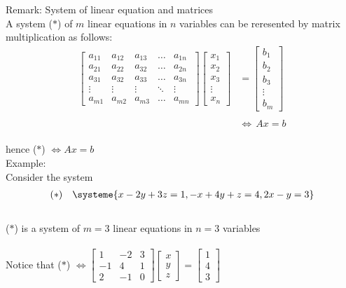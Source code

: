 \documentclass{jhwhw}
\begin{document}
Remark: System of linear equation and matrices\\
A system (\(\ast\)) of \(m\) linear equations in \(n\) variables can be reresented by matrix multiplication as follows:\\

\begin{align*} \begin{bmatrix} a_{11} & a_{12} & a_{13} & \ldots & a_{1n} \\ a_{21} & a_{22} & a_{32} & \ldots & a_{2n} \\ a_{31} & a_{32} & a_{33} & \ldots & a_{3n} \\ \vdots & \vdots & \vdots & \ddots & \vdots \\ a_{m1} & a_{m2} & a_{m3} & \ldots & a_{mn} \end{bmatrix} \begin{bmatrix} x_1 \\ x_2 \\ x_3 \\ \vdots \\ x_n \end{bmatrix} &= \begin{bmatrix} b_1 \\ b_2 \\ b_3 \\ \vdots \\ b_m \end{bmatrix} \\ \\ 
&\Leftrightarrow \, Ax = b
\end{align*}
\\
hence (\(\ast\)) \(\Leftrightarrow Ax = b\)\\

Example:\\
Consider the system
\begin{align*} (\ast) \quad \systeme{x-2y+3z=1,-x+4y+z=4, 2x-y=3} \end{align*}\\
(\(\ast\)) is a system of \(m=3\) linear equations in \(n=3\) variables\\ \\
Notice that (\(\ast\)) \(\Leftrightarrow \begin{bmatrix} 1 & -2 & 3 \\ -1 & 4 & 1 \\ 2 & -1 & 0 \end{bmatrix} \begin{bmatrix} x \\ y \\ z \end{bmatrix} = \begin{bmatrix} 1 \\ 4 \\ 3 \end{bmatrix}\)\\
\end{document}
